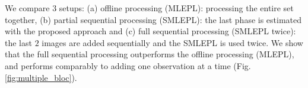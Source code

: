     We compare $3$ setups: (a) offline processing (\acs{MLEPL}): processing the entire set together, (b) partial sequential processing (\acs{SMLEPL}): the last phase is estimated with the proposed approach and (c) full sequential processing (\acs{SMLEPL} twice): the last $2$ images are added sequentially and the \acs{SMLEPL} is used twice. %
    We show that the full sequential processing outperforms the offline processing (\acs{MLEPL}), and performs comparably to adding one observation at a time (Fig. \ref{fig:multiple_bloc}).%
    